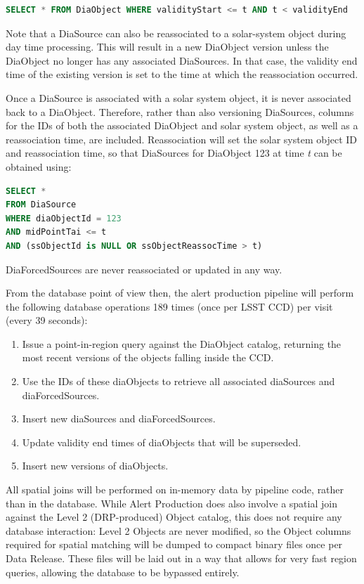 \documentclass[DM,lsstdraft,toc]{lsstdoc}
\begin{document}
\begin{lstlisting}[language=SQL]
SELECT * FROM DiaObject WHERE validityStart <= t AND t < validityEnd
\end{lstlisting}

Note that a DiaSource can also be reassociated to a solar-system object
during day time processing. This will result in a new DiaObject version
unless the DiaObject no longer has any associated DiaSources. In that
case, the validity end time of the existing version is set to the time
at which the reassociation occurred.

Once a DiaSource is associated with a solar system object, it is never
associated back to a DiaObject. Therefore, rather than also versioning
DiaSources, columns for the IDs of both the associated DiaObject and
solar system object, as well as a reassociation time, are included.
Reassociation will set the solar system object ID and reassociation
time, so that DiaSources for DiaObject 123 at time \emph{t} can be
obtained using:

\begin{lstlisting}[language=SQL]
SELECT *
FROM DiaSource
WHERE diaObjectId = 123
AND midPointTai <= t
AND (ssObjectId is NULL OR ssObjectReassocTime > t)
\end{lstlisting}

DiaForcedSources are never reassociated or updated in any way.

From the database point of view then, the alert production pipeline will
perform the following database operations 189 times (once per LSST CCD)
per visit (every 39 seconds):

\begin{enumerate}
\def\labelenumi{\arabic{enumi}.}
\item
  Issue a point-in-region query against the DiaObject catalog, returning
  the most recent versions of the objects falling inside the CCD.
\item
  Use the IDs of these diaObjects to retrieve all associated diaSources
  and diaForcedSources.
\item
  Insert new diaSources and diaForcedSources.
\item
  Update validity end times of diaObjects that will be superseded.
\item
  Insert new versions of diaObjects.
\end{enumerate}

All spatial joins will be performed on in-memory data by pipeline code,
rather than in the database. While Alert Production does also involve a
spatial join against the Level 2 (DRP-produced) Object catalog, this
does not require any database interaction: Level 2 Objects are never
modified, so the Object columns required for spatial matching will be
dumped to compact binary files once per Data Release. These files will
be laid out in a way that allows for very fast region queries, allowing
the database to be bypassed entirely.
\end{document}
